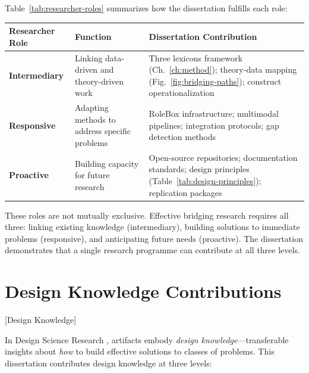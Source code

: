 \documentclass[../main.tex]{subfiles}
\begin{document}
Table~\ref{tab:researcher-roles} summarizes how the dissertation fulfills each role:

\begin{center}
\small
\tableminimal
\begin{tabular}{@{}p{2.5cm}p{4cm}p{5.5cm}@{}}
\toprule
\textbf{Researcher Role} & \textbf{Function} & \textbf{Dissertation Contribution} \\
\midrule
\textbf{Intermediary} & Linking data-driven and theory-driven work & Three lexicons framework (Ch.~\ref{ch:method}); theory-data mapping (Fig.~\ref{fig:bridging-paths}); construct operationalization \\
\addlinespace
\textbf{Responsive} & Adapting methods to address specific problems & RoleBox infrastructure; multimodal pipelines; integration protocols; gap detection methods \\
\addlinespace
\textbf{Proactive} & Building capacity for future research & Open-source repositories; documentation standards; design principles (Table~\ref{tab:design-principles}); replication packages \\
\bottomrule
\end{tabular}
\end{center}

These roles are not mutually exclusive. Effective bridging research requires all three: linking existing knowledge (intermediary), building solutions to immediate problems (responsive), and anticipating future needs (proactive). The dissertation demonstrates that a single research programme can contribute at all three levels.


\section{Design Knowledge Contributions}[Design Knowledge]

In Design Science Research \cite{hevner2004design,gregor2013positioning}, artifacts embody \textit{design knowledge}---transferable insights about \emph{how} to build effective solutions to classes of problems. This dissertation contributes design knowledge at three levels:
\end{document}
